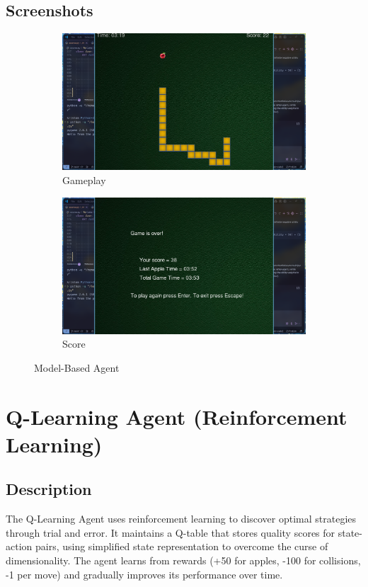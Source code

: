 \documentclass[11pt,a4paper]{article}
\begin{document}
\subsection{Screenshots}
\begin{figure}[H]
    \centering
    \begin{subfigure}{0.45\textwidth}
        \includegraphics[width=\textwidth]{ss/model_based_play.png}
        \caption{Gameplay}
    \end{subfigure}
    \hfill
    \begin{subfigure}{0.45\textwidth}
        \includegraphics[width=\textwidth]{ss/model_based_score.png}
        \caption{Score}
    \end{subfigure}
    \caption{Model-Based Agent}
\end{figure}

\section{Q-Learning Agent (Reinforcement Learning)}
\subsection{Description}
The Q-Learning Agent uses reinforcement learning to discover optimal strategies through trial and error. It maintains a Q-table that stores quality scores for state-action pairs, using simplified state representation to overcome the curse of dimensionality. The agent learns from rewards (+50 for apples, -100 for collisions, -1 per move) and gradually improves its performance over time.
\end{document}

